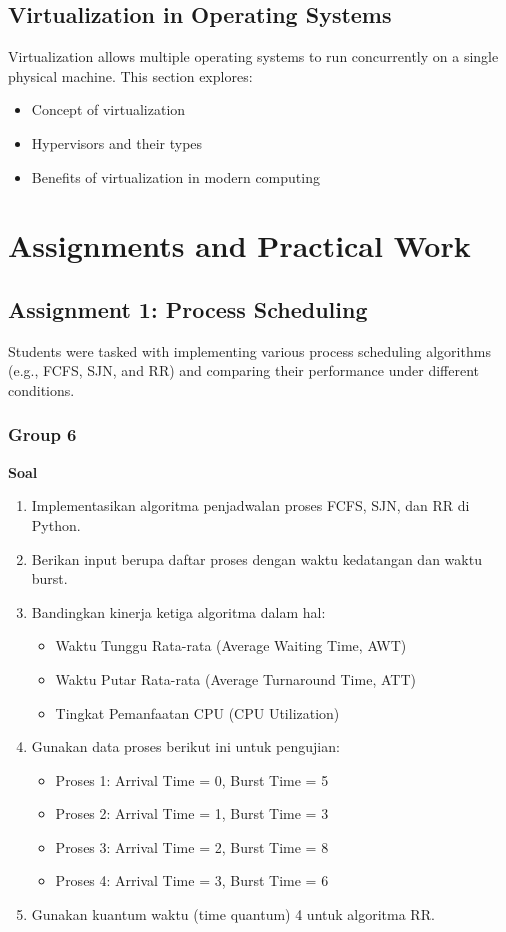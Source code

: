 \documentclass[12pt]{article}
\begin{document}
\subsection{Virtualization in Operating Systems}
Virtualization allows multiple operating systems to run concurrently on a single physical machine. This section explores:
\begin{itemize}
    \item Concept of virtualization
    \item Hypervisors and their types
    \item Benefits of virtualization in modern computing
\end{itemize}

\section{Assignments and Practical Work}
\subsection{Assignment 1: Process Scheduling}
Students were tasked with implementing various process scheduling algorithms (e.g., FCFS, SJN, and RR) and comparing their performance under different conditions.

\subsubsection{Group 6}
\vspace{0.5cm}
\textbf{Soal}
\begin{enumerate}
    \item Implementasikan algoritma penjadwalan proses FCFS, SJN, dan RR di Python.
    \item Berikan input berupa daftar proses dengan waktu kedatangan dan waktu burst.
    \item Bandingkan kinerja ketiga algoritma dalam hal:
    \begin{itemize}
        \item Waktu Tunggu Rata-rata (Average Waiting Time, AWT)
        \item Waktu Putar Rata-rata (Average Turnaround Time, ATT)
        \item Tingkat Pemanfaatan CPU (CPU Utilization)
    \end{itemize}
    \item Gunakan data proses berikut ini untuk pengujian:
    \begin{itemize}
        \item Proses 1: Arrival Time = 0, Burst Time = 5
        \item Proses 2: Arrival Time = 1, Burst Time = 3
        \item Proses 3: Arrival Time = 2, Burst Time = 8
        \item Proses 4: Arrival Time = 3, Burst Time = 6
    \end{itemize}
    \item Gunakan kuantum waktu (time quantum) 4 untuk algoritma RR.
\end{enumerate}
\end{document}
